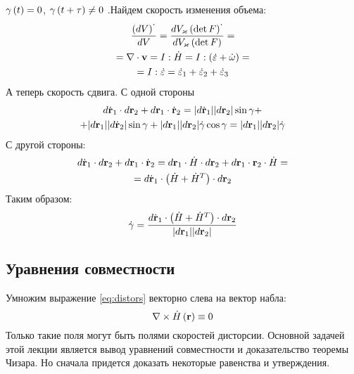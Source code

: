 \documentclass[a4papper, 14pt]{book}
\renewcommand{\epsilon}{\ensuremath{\varepsilon}}
\renewcommand{\kappa}{\ensuremath{\varkappa}}
\newcommand{\lf}{\ensuremath \left(}
\newcommand{\ri}{\ensuremath \right)}
\newcommand{\mf}[1]{\ensuremath\mathbf{#1}}
\theoremstyle{plain} %
\theoremstyle{definition} %
\theoremstyle{remark} %
\begin{document}
	\section{}
	\newcommand{\ont}{^{\displaystyle\cdot}}
	$\gamma\lf t\ri = 0$, $\gamma\lf t + \tau\ri\neq 0$ .Найдем скорость изменения объема:
	\begin{multline}
	\dfrac{\lf dV\ri\ont}{dV} = \dfrac{dV_{\kappa}\lf\det F\ri\ont}{dV_{\kappa}\lf\det F\ri} =\\= \nabla\cdot\mf{v} = I:\dot{H} = I:\lf \dot{\epsilon} + \dot{\omega}\ri =\\= I:\dot{\epsilon} = \dot{\epsilon}_1 + \dot{\epsilon}_2 + \dot{\epsilon}_3 
	\end{multline}
	А теперь скорость сдвига. С одной стороны
	\begin{multline}
	d\dot{\mf{r}}_1 \cdot d\mf{r}_2 + d\mf{r}_1 \cdot\dot{\mf{r}}_2 = \vert d\dot{\mf{r}}_1\vert\vert d{\mf{r}}_2\vert\sin\gamma +\\+ \vert d{\mf{r}}_1\vert\vert d\dot{\mf{r}}_2\vert\sin\gamma + \vert d{\mf{r}}_1\vert\vert d{\mf{r}}_2\vert\dot{\gamma}\cos\gamma = \vert d{\mf{r}}_1\vert\vert d{\mf{r}}_2\vert \dot{\gamma} 
	\end{multline}
	С другой стороны:
	\begin{multline}
	d\dot{\mf{r}}_1 \cdot d\mf{r}_2 + d\mf{r}_1 \cdot\dot{\mf{r}}_2 = d{\mf{r}}_1\cdot\dot{H} \cdot d\mf{r}_2 + d\mf{r}_1 \cdot{\mf{r}}_2\cdot\dot{H} =\\= d\dot{\mf{r}}_1\cdot\lf \dot{H}  + \dot{H}^T\ri\cdot d\mf{r}_2 
	\end{multline}
	Таким образом:
	\begin{equation}
	\dot{\gamma} = \dfrac{d\dot{\mf{r}}_1\cdot\lf \dot{H}  + \dot{H}^T\ri\cdot d\mf{r}_2 }{\vert d{\mf{r}}_1\vert\vert d{\mf{r}}_2\vert}
	\end{equation}
	\subsection{Уравнения совместности}
	Умножим выражение \eqref{eq:distors} векторно слева на вектор набла:
	\begin{equation}
	\nabla\times\dot{H}\lf\mf{r}\ri \equiv 0
	\end{equation}
	Только такие поля могут быть полями скоростей дисторсии. Основной задачей этой лекции является вывод уравнений совместности и доказательство теоремы Чизара. Но сначала придется доказать некоторые равенства и утверждения.  \\
	
\end{document}

